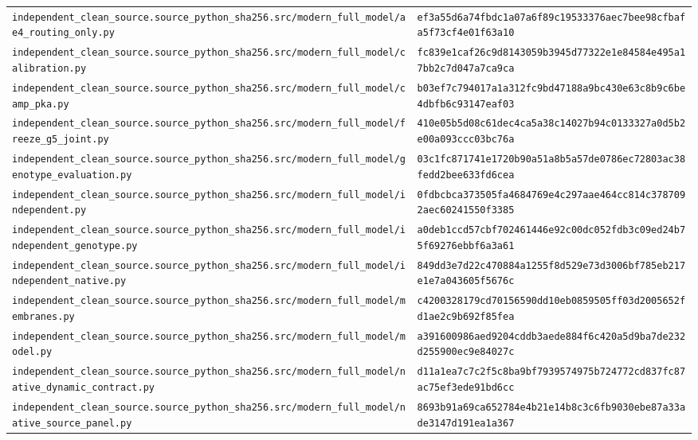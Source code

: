 \begin{longtable}{p{.46\linewidth}p{.46\linewidth}}
\nolinkurl{independent_clean_source.source_python_sha256.src/modern_full_model/ae4_routing_only.py} & \nolinkurl{ef3a55d6a74fbdc1a07a6f89c19533376aec7bee98cfbafa5f73cf4e01f63a10} \\
\nolinkurl{independent_clean_source.source_python_sha256.src/modern_full_model/calibration.py} & \nolinkurl{fc839e1caf26c9d8143059b3945d77322e1e84584e495a17bb2c7d047a7ca9ca} \\
\nolinkurl{independent_clean_source.source_python_sha256.src/modern_full_model/camp_pka.py} & \nolinkurl{b03ef7c794017a1a312fc9bd47188a9bc430e63c8b9c6be4dbfb6c93147eaf03} \\
\nolinkurl{independent_clean_source.source_python_sha256.src/modern_full_model/freeze_g5_joint.py} & \nolinkurl{410e05b5d08c61dec4ca5a38c14027b94c0133327a0d5b2e00a093ccc03bc76a} \\
\nolinkurl{independent_clean_source.source_python_sha256.src/modern_full_model/genotype_evaluation.py} & \nolinkurl{03c1fc871741e1720b90a51a8b5a57de0786ec72803ac38fedd2bee633fd6cea} \\
\nolinkurl{independent_clean_source.source_python_sha256.src/modern_full_model/independent.py} & \nolinkurl{0fdbcbca373505fa4684769e4c297aae464cc814c3787092aec60241550f3385} \\
\nolinkurl{independent_clean_source.source_python_sha256.src/modern_full_model/independent_genotype.py} & \nolinkurl{a0deb1ccd57cbf702461446e92c00dc052fdb3c09ed24b75f69276ebbf6a3a61} \\
\nolinkurl{independent_clean_source.source_python_sha256.src/modern_full_model/independent_native.py} & \nolinkurl{849dd3e7d22c470884a1255f8d529e73d3006bf785eb217e1e7a043605f5676c} \\
\nolinkurl{independent_clean_source.source_python_sha256.src/modern_full_model/membranes.py} & \nolinkurl{c4200328179cd70156590dd10eb0859505ff03d2005652fd1ae2c9b692f85fea} \\
\nolinkurl{independent_clean_source.source_python_sha256.src/modern_full_model/model.py} & \nolinkurl{a391600986aed9204cddb3aede884f6c420a5d9ba7de232d255900ec9e84027c} \\
\nolinkurl{independent_clean_source.source_python_sha256.src/modern_full_model/native_dynamic_contract.py} & \nolinkurl{d11a1ea7c7c2f5c8ba9bf7939574975b724772cd837fc87ac75ef3ede91bd6cc} \\
\nolinkurl{independent_clean_source.source_python_sha256.src/modern_full_model/native_source_panel.py} & \nolinkurl{8693b91a69ca652784e4b21e14b8c3c6fb9030ebe87a33ade3147d191ea1a367} \\

\end{longtable}
